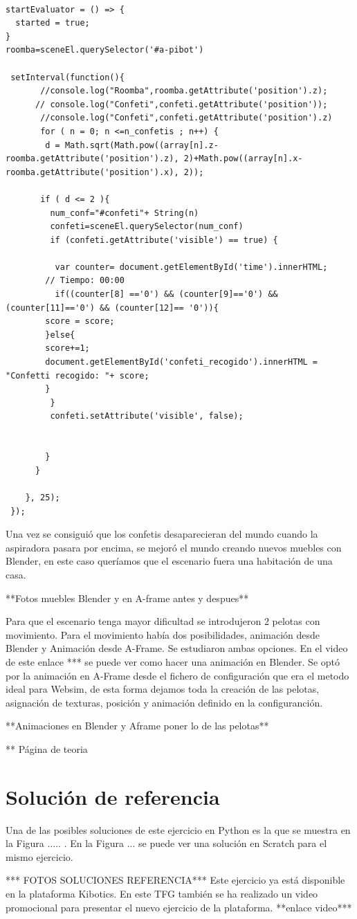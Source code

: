 \begin{lstlisting}

startEvaluator = () => {
  started = true;
}
roomba=sceneEl.querySelector('#a-pibot')

 setInterval(function(){
       //console.log("Roomba",roomba.getAttribute('position').z);
      // console.log("Confeti",confeti.getAttribute('position'));
       //console.log("Confeti",confeti.getAttribute('position').z)
       for ( n = 0; n <=n_confetis ; n++) {
        d = Math.sqrt(Math.pow((array[n].z-roomba.getAttribute('position').z), 2)+Math.pow((array[n].x-roomba.getAttribute('position').x), 2));

       if ( d <= 2 ){
         num_conf="#confeti"+ String(n)
         confeti=sceneEl.querySelector(num_conf)
         if (confeti.getAttribute('visible') == true) {
	      
	      var counter= document.getElementById('time').innerHTML;
		// Tiempo: 00:00	
	      if((counter[8] =='0') && (counter[9]=='0') && (counter[11]=='0') && (counter[12]== '0')){      
		score = score;
		}else{
		score+=1;
		document.getElementById('confeti_recogido').innerHTML = "Confetti recogido: "+ score;
		}
         }
         confeti.setAttribute('visible', false);


        }
      }
	
    }, 25);
 });
\end{lstlisting}


Una vez se consiguió que los confetis desaparecieran del mundo cuando la aspiradora pasara por encima, se mejoró el mundo creando  nuevos muebles con Blender, en este caso queríamos que el escenario fuera una habitación de una casa.

**Fotos muebles Blender y en A-frame antes y despues**


Para que el escenario tenga mayor dificultad se introdujeron 2 pelotas con movimiento. Para el movimiento había dos posibilidades, animación desde Blender y Animación desde A-Frame. 
Se estudiaron ambas opciones. En el video de este enlace ***  se puede ver como hacer una animación en Blender. Se optó por la animación en A-Frame desde el fichero de configuración que era el metodo ideal para Websim, de esta forma dejamos toda la creación de las pelotas, asignación de texturas, posición y  animación definido  en la configuranción.

**Animaciones en Blender y Aframe poner lo de las pelotas**

** Página de teoria

\section{Solución de referencia}

Una de las posibles soluciones de este ejercicio en Python es la que se muestra en la Figura ..... . En la Figura ... se puede ver una solución en Scratch para el mismo ejercicio.

*** FOTOS SOLUCIONES REFERENCIA***
Este ejercicio ya está disponible en la plataforma Kibotics. En este TFG también se ha realizado un video promocional para presentar el nuevo ejercicio de la plataforma. **enlace video***